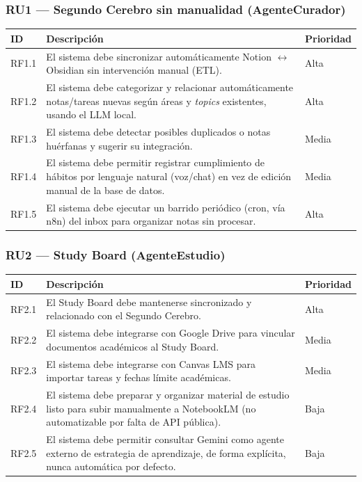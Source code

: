\documentclass[11pt,a4paper]{article}
\begin{document}
\subsubsection*{RU1 --- Segundo Cerebro sin manualidad (AgenteCurador)}
\begin{longtable}{@{}p{1.5cm}p{11.2cm}p{1.7cm}@{}}
\toprule
ID & Descripción & Prioridad \\
\midrule
\endhead
RF1.1 & El sistema debe sincronizar automáticamente Notion $\leftrightarrow$ Obsidian sin intervención manual (ETL). & Alta \\
RF1.2 & El sistema debe categorizar y relacionar automáticamente notas/tareas nuevas según áreas y \emph{topics} existentes, usando el LLM local. & Alta \\
RF1.3 & El sistema debe detectar posibles duplicados o notas huérfanas y sugerir su integración. & Media \\
RF1.4 & El sistema debe permitir registrar cumplimiento de hábitos por lenguaje natural (voz/chat) en vez de edición manual de la base de datos. & Media \\
RF1.5 & El sistema debe ejecutar un barrido periódico (cron, vía n8n) del inbox para organizar notas sin procesar. & Alta \\
\bottomrule
\end{longtable}

\subsubsection*{RU2 --- Study Board (AgenteEstudio)}
\begin{longtable}{@{}p{1.5cm}p{11.2cm}p{1.7cm}@{}}
\toprule
ID & Descripción & Prioridad \\
\midrule
\endhead
RF2.1 & El Study Board debe mantenerse sincronizado y relacionado con el Segundo Cerebro. & Alta \\
RF2.2 & El sistema debe integrarse con Google Drive para vincular documentos académicos al Study Board. & Media \\
RF2.3 & El sistema debe integrarse con Canvas LMS para importar tareas y fechas límite académicas. & Media \\
RF2.4 & El sistema debe preparar y organizar material de estudio listo para subir manualmente a NotebookLM (no automatizable por falta de API pública). & Baja \\
RF2.5 & El sistema debe permitir consultar Gemini como agente externo de estrategia de aprendizaje, de forma explícita, nunca automática por defecto. & Baja \\
\bottomrule
\end{longtable}
\end{document}
